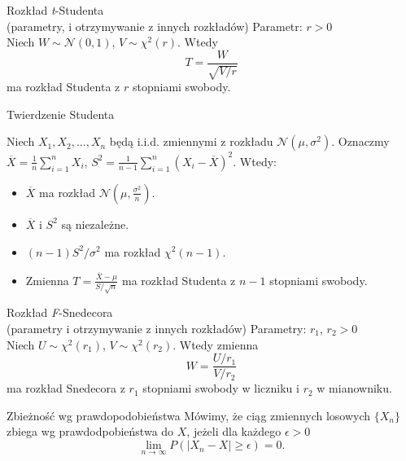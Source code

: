 \documentclass[avery5371, grid, frame]{flashcards}
\begin{document}
\begin{flashcard}[Definicja]{Rozkład \textit{t}-Studenta \\ (parametry, i otrzymywanie z innych rozkładów)}
    Parametr: $r > 0$ \\
    Niech $W \sim \mathcal{N}(0, 1)$, $V \sim \chi^2(r)$. Wtedy $$ T = \frac{W}{\sqrt{V/r}} $$ ma rozkład Studenta z $r$ stopniami swobody.
\end{flashcard}

\begin{flashcard}[Twierdzenie]{Twierdzenie Studenta}
\begin{small}
\begin{flushleft}
    Niech $X_1, X_2, \dots, X_n$ będą i.i.d. zmiennymi z rozkładu $\mathcal{N}(\mu, \sigma^2)$. Oznaczmy $\overline{X} = \frac{1}{n} \sum_{i=1}^{n} X_i$, $S^2 = \frac{1}{n-1} \sum_{i=1}^{n} (X_i - \overline{X})^2$. Wtedy:
    \begin{itemize}
        \item $\overline{X}$ ma rozkład $\mathcal{N}(\mu, \frac{\sigma^2}{n})$.
        \item $\overline{X}$ i $S^2$ są niezależne.
        \item $(n-1)S^2/\sigma^2$ ma rozkład $\chi^2(n-1)$.
        \item Zmienna $ T = \frac{\overline{X} - \mu}{S / \sqrt{n}} $ ma rozkład Studenta z $n-1$ stopniami swobody.
    \end{itemize}
\end{flushleft}
\end{small}
\end{flashcard}

\begin{flashcard}[Definicja]{Rozkład \textit{F}-Snedecora \\ (parametry i otrzymywanie z innych rozkładów)}
    Parametry: $r_1$, $r_2 > 0$ \\
    Niech $U \sim \chi^2(r_1)$, $V \sim \chi^2(r_2)$. Wtedy zmienna $$ W = \frac{U/r_1}{V/r_2} $$ ma rozkład Snedecora z $r_1$ stopniami swobody w liczniku i $r_2$ w mianowniku.
\end{flashcard}

\begin{flashcard}[Definicja]{Zbieżność wg prawdopodobieństwa}
    Mówimy, że ciąg zmiennych losowych $\{ X_n \}$ zbiega wg prawdodpobieństwa do $X$, jeżeli dla każdego $\epsilon > 0$ $$\lim_{n \rightarrow \infty} P(|X_n - X| \geq \epsilon) = 0.$$
\end{flashcard}
\end{document}
